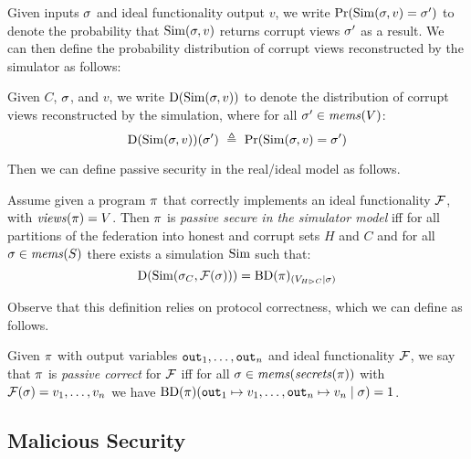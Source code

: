 Given inputs $\sigma$ and ideal
functionality output $v$, we write $ \mathrm{Pr}(\mathrm{Sim}(\sigma,v) = \sigma') $
to denote the probability that $\mathrm{Sim}(\sigma,v)$ returns corrupt views
$\sigma'$ as a result. We can then define the probability distribution
of corrupt views reconstructed by the simulator as follows:
\begin{definition}
  Given $C$, $\sigma$, and $v$, we write $\mathrm{D}(\mathrm{Sim}(\sigma,v))$ to
  denote the distribution of corrupt views reconstructed by the
  simulation, where for
  all $\sigma' \in \mathit{mems}(V)$:
  $$
  \dist(\SIM(\store,v))(\store')\ \defeq\ \prob(\SIM(\store,v) = \store') 
  $$
\end{definition}
Then we can define passive security in the real/ideal
model as follows. 
\begin{definition}
  Assume given a program $\pi$ that correctly implements an ideal
  functionality $\mathcal{F}$, with $\mathit{views}(\pi) = V$.  Then $\pi$
  is \emph{passive secure in the simulator model} iff for all
  partitions of the federation into honest and corrupt sets $H$ and $C$
  and for all $\sigma \in \mathit{mems}(S)$ there exists a
  simulation $\mathrm{Sim}$ such that:
  $$
  \mathrm{D}(\mathrm{Sim}(\sigma_{C},\mathcal{F}(\sigma))) = \mathrm{BD}(\pi)_{({V_{H \rhd C}}|{\sigma})}
  $$
\end{definition}
Observe that this definition relies on protocol correctness, which
we can define as follows.
\begin{definition}
  Given $\pi$ with output variables $\texttt{out}_{1},\ldots,\texttt{out}_{n}$ and ideal
  functionality $\mathcal{F}$, we say that $\pi$ is \emph{passive correct}
  for $\mathcal{F}$ iff for all $\sigma \in \mathit{mems}(\mathit{secrets}(\pi))$
  with $\mathcal{F}(\sigma) = v_1,\ldots,v_n$ we have
  $\mathrm{BD}(\pi)(\texttt{out}_{1} \mapsto v_1,\ldots,\texttt{out}_{n} \mapsto v_n \mid \sigma) = 1$.
\end{definition}

\subsection{Malicious Security}

